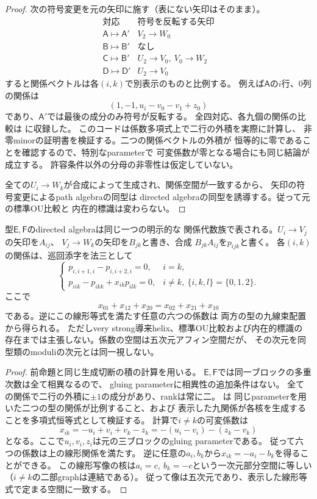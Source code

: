\begin{proof}
次の符号変更を元の矢印に施す（表にない矢印はそのまま）。
\[
\begin{array}{c|l}
 \text{対応}&\text{符号を反転する矢印}\\ \hline
 \mathsf A\mapsto\mathsf A'&V_2\to W_0\\
 \mathsf B\mapsto\mathsf B'&\text{なし}\\
 \mathsf C\mapsto\mathsf B'&U_2\to V_0,\ V_0\to W_2\\
 \mathsf D\mapsto\mathsf D'&U_2\to V_0
\end{array}
\]
すると関係ベクトルは各$(i,k)$で別表示のものと比例する。
例えば$\mathsf A$の$i$行、$0$列の関係は
\[
 (1,-1,u_i-v_0-v_1+z_0)
\]
であり、$\mathsf A'$では最後の成分のみ符号が反転する。
全四対応、各九個の関係の比較は
に収録した。
このコードは係数多項式上で二行の外積を実際に計算し、
非零minorの証明書を検証する。二つの関係ベクトルの外積が
恒等的に零であることを確認するので、特別なparameterで
可変係数が零となる場合にも同じ結論が成立する。
許容条件以外の分母の非零性は仮定していない。

全ての$U_i\to W_k$が合成によって生成され、関係空間が一致するから、
矢印の符号変更によるpath algebraの同型は
directed algebraの同型を誘導する。従って元の標準OU比較と
内在的標識は変わらない。
\end{proof}

\begin{proposition}[残る六候補の単一関係代数族]
\label{prop:ou-iv-residual-relation-family}
型$\mathsf E,\mathsf F$のdirected algebraは同じ一つの明示的な
関係代数族で表される。$U_i\to V_j$の矢印を$A_{ij}$、
$V_j\to W_k$の矢印を$B_{jk}$と書き、合成
$B_{jk}A_{ij}$を$p_{ijk}$と書く。
各$(i,k)$の関係は、巡回添字を法三として
\[
 \begin{cases}
 p_{i,i+1,i}-p_{i,i+2,i}=0,&i=k,\\
 p_{iik}-p_{ikk}+x_{ik}p_{ilk}=0,&i\ne k,\
                 \{i,k,l\}=\{0,1,2\}.
 \end{cases}
\]
ここで
\[
 x_{01}+x_{12}+x_{20}=x_{02}+x_{21}+x_{10}
\]
である。逆にこの線形等式を満たす任意の六つの係数は
両方の型の九線束配置から得られる。
ただしvery strong導来helix、標準OU比較および内在的標識の
存在までは主張しない。係数の空間は五次元アフィン空間だが、
その次元を同型類のmoduliの次元とは同一視しない。
\end{proposition}
\begin{proof}
前命題と同じ生成切断の積の計算を用いる。
$\mathsf E,\mathsf F$では同一ブロックの多重次数は全て相異なるので、
gluing parameterに相異性の追加条件はない。
全ての関係で二行の外積に$\pm1$の成分があり、rankは常に二。
は
同じparameterを用いた二つの型の関係が比例すること、および
表示した九関係が各核を生成することを多項式恒等式として検証する。
計算で$i\ne k$の可変係数は
\[
 x_{ik}=-u_i+v_i+v_k-z_k
       =-(u_i-v_i)-(z_k-v_k)
\]
となる。ここで$u_i,v_i,z_i$は元の三ブロックのgluing parameterである。
従って六つの係数は上の線形関係を満たす。
逆に任意の$a_i,b_k$から$x_{ik}=-a_i-b_k$を得ることができる。
この線形写像の核は$a_i=c,\ b_k=-c$という一次元部分空間に等しい
（$i\ne k$の二部graphは連結である）。
従って像は五次元であり、表示した線形等式で定まる空間に一致する。
\end{proof}

